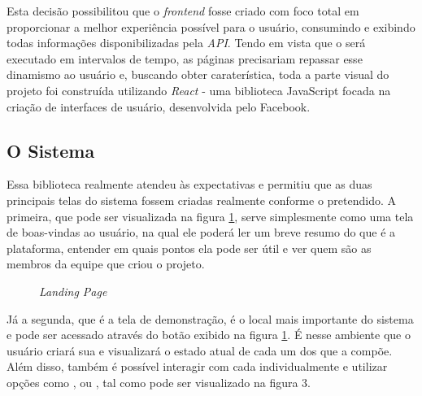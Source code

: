 Esta decisão possibilitou que o \textit{frontend} fosse criado com foco total em proporcionar a melhor experiência possível para o usuário, consumindo e exibindo todas informações disponibilizadas pela \textit{API}. Tendo em vista que o \adaptive{}será executado em intervalos de tempo, as páginas precisariam repassar esse dinamismo ao usuário e, buscando obter caraterística, toda a parte visual do projeto foi construída utilizando \textit{React} - uma biblioteca JavaScript focada na criação de interfaces de usuário, desenvolvida pelo Facebook.


\subsection{O Sistema}
\label{sec:o_sistema}

Essa biblioteca realmente atendeu às expectativas e permitiu que as duas principais telas do sistema fossem criadas realmente conforme o pretendido. A primeira, que pode ser visualizada na figura \ref{fig:landing_page}, serve simplesmente como uma tela de boas-vindas ao usuário, na qual ele poderá ler um breve resumo do que é a plataforma, entender em quais pontos ela pode ser útil e ver quem são as membros da equipe que criou o projeto.

\begin{figure}[H]
    \centering
    \caption{\textit{Landing Page}}
    \label{fig:landing_page}
\end{figure}

Já a segunda, que é a tela de demonstração, é o local mais importante do sistema e pode ser acessado através do botão  exibido na figura \ref{fig:landing_page}. É nesse ambiente que o usuário criará sua \dockerNetwork{} e visualizará o estado atual de cada um dos \containers{} que a compõe. Além disso, também é possível interagir com cada \conteiner{} individualmente e utilizar opções como ,  ou , tal como pode ser visualizado na figura 3.

